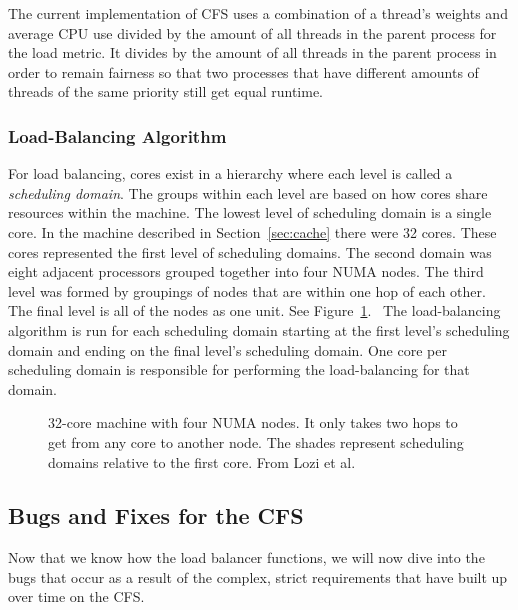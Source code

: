 \documentclass{sig-alternate}
\begin{document}
The current implementation of CFS uses a combination of a thread's weights and average CPU use divided by the amount of all threads in the parent process for the load metric. It divides by the amount of all threads in the parent process in order to remain fairness so that two processes that have different amounts of threads of the same priority still get equal runtime.~\cite{Lozi:2016}

\subsubsection{Load-Balancing Algorithm}
\label{sec:loadbalancealg}

For load balancing, cores exist in a hierarchy where each level is called a \emph{scheduling domain}. The groups within each level are based on how cores share resources within the machine. The lowest level of scheduling domain is a single core. In the machine described in Section~\ref{sec:cache} there were 32 cores. These cores represented the first level of scheduling domains. The second domain was eight adjacent processors grouped together into four NUMA nodes. The third level was formed by groupings of nodes that are within one hop of each other. The final level is all of the nodes as one unit. See Figure~\ref{fig:domains}.~\cite{Lozi:2016}
The load-balancing algorithm is run for each scheduling domain starting at the first level's scheduling domain and ending on the final level's scheduling domain. One core per scheduling domain is responsible for performing the load-balancing for that domain.

\begin{figure}
\centering
{}
\caption{32-core machine with four NUMA nodes. It only takes two hops to get from any core to another node. The shades represent scheduling domains relative to the first core.  From Lozi et al.~\cite{Lozi:2016}}
\label{fig:domains}
\end{figure}



\subsection{Bugs and Fixes for the CFS}
\label{sec:cfsbugs}

Now that we know how the load balancer functions, we will now dive into the bugs that occur as a result of the complex, strict requirements that have built up over time on the CFS.
\end{document}

